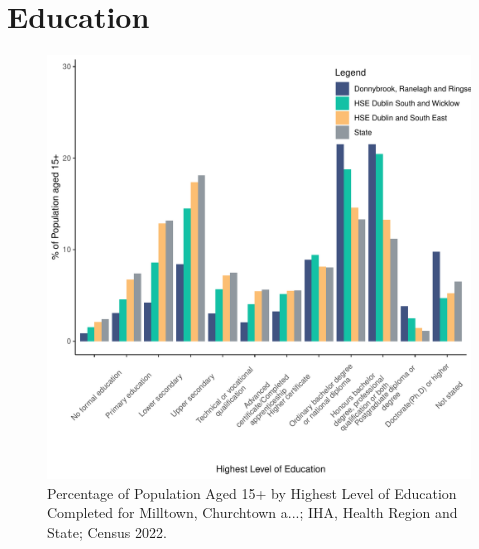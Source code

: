 \documentclass{article}
\begin{document}
\section{Education}\label{sect:Edu}
\begin{figure}[H]
	\centering
	\includegraphics[width = 120mm]{../figures/EduED.pdf}
	\caption{Percentage of Population Aged 15+ by Highest Level of Education Completed for Milltown, Churchtown a...; IHA, Health Region and State; Census 2022.}
	\label{fig:vbnv}
	\end{figure}
\end{document}

